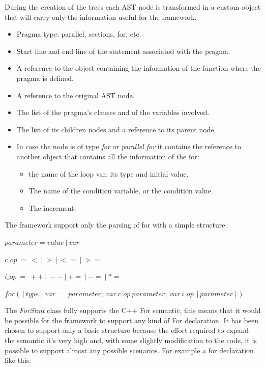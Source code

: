 \documentclass[a4paper,11pt,oneside]{book}
\begin{document}
During the creation of the trees each AST node is transformed in a custom object that will carry only the information useful for the framework. 

\begin{itemize}
\item Pragma type: parallel, sections, for, etc.
\item Start line and end line of the statement associated with the pragma.
\item A reference to the object containing the information of the function where the pragma is defined.
\item A reference to the original AST node.
\item The list of the pragma’s clauses and of the variables involved. 
\item The list of its children nodes and a reference to its parent node.
\item In case the node is of type \emph{for} or \emph{parallel for} it contains the reference to another object that contains all the information of the for:
\begin{itemize}
\item the name of the loop var, its type and initial value.
\item The name of the condition variable, or the condition value.
\item The increment.
\end{itemize}
\end{itemize}

The framework support only the parsing of for with a simple structure: \newline

$parameter = value \ | \ var$

$c\_op \ = \ < \ | \ > \ | \ <= \ | \ >= $

$i\_op \ = \ ++ \ | \ -- \ | \ += \ | \ -= \ | \ *=$ 

$for([type] \ var \ = \ parameter; \ var \ c\_op \ parameter; \ var \ i\_op \ [parameter])$ \newline


The \emph{ForStmt} class fully supports the C++ For semantic, this means that it would be possible for the framework to support any kind of For declaration. It has been chosen to support only a basic structure because the effort required to expand the semantic it’s very high and, with some slightly modification to the code, it is possible to support almost any possible scenarios. For example a for declaration like this:
\end{document}
